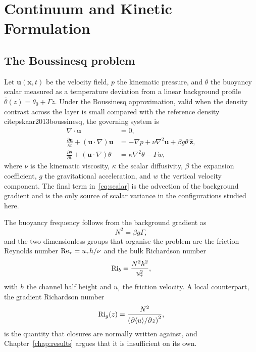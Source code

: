 \chapter{Continuum and Kinetic Formulation}
\label{chap:theory}

\section{The Boussinesq problem}
\label{sec:theory-boussinesq}

Let $\mathbf{u}(\mathbf{x},t)$ be the velocity field, $p$ the kinematic
pressure, and $\theta$ the buoyancy scalar measured as a temperature deviation
from a linear background profile $\bar{\theta}(z) = \theta_0 + \Gamma z$. Under
the Boussinesq approximation, valid when the density contrast across the layer
is small compared with the reference density \\citep{skaar2013boussinesq},
the governing system is
\begin{align}
  \nabla \cdot \mathbf{u} &= 0, \label{eq:continuity} \\
  \frac{\partial \mathbf{u}}{\partial t} + (\mathbf{u} \cdot \nabla)\mathbf{u}
    &= -\nabla p + \nu \nabla^{2} \mathbf{u} + \beta g \theta \, \hat{\mathbf{z}},
    \label{eq:momentum} \\
  \frac{\partial \theta}{\partial t} + (\mathbf{u} \cdot \nabla)\theta
    &= \kappa \nabla^{2} \theta - \Gamma w, \label{eq:scalar}
\end{align}
where $\nu$ is the kinematic viscosity, $\kappa$ the scalar diffusivity, $\beta$
the expansion coefficient, $g$ the gravitational acceleration, and $w$ the
vertical velocity component. The final term in~\eqref{eq:scalar} is the
advection of the background gradient and is the only source of scalar variance
in the configurations studied here.

The buoyancy frequency follows from the background gradient as
\begin{equation}
  N^{2} = \beta g \Gamma,
  \label{eq:buoyancy-frequency}
\end{equation}
and the two dimensionless groups that organise the problem are the friction
Reynolds number $\mathrm{Re}_\tau = u_\tau h / \nu$ and the bulk Richardson number
\begin{equation}
  \mathrm{Ri}_b = \frac{N^{2} h^{2}}{u_\tau^{2}},
  \label{eq:bulk-richardson}
\end{equation}
with $h$ the channel half height and $u_\tau$ the friction velocity. A local
counterpart, the gradient Richardson number
\begin{equation}
  \mathrm{Ri}_g(z) = \frac{N^{2}}{\left( \partial \langle u \rangle / \partial z \right)^{2}},
  \label{eq:gradient-richardson}
\end{equation}
is the quantity that closures are normally written against, and
Chapter~\ref{chap:results} argues that it is insufficient on its own.

